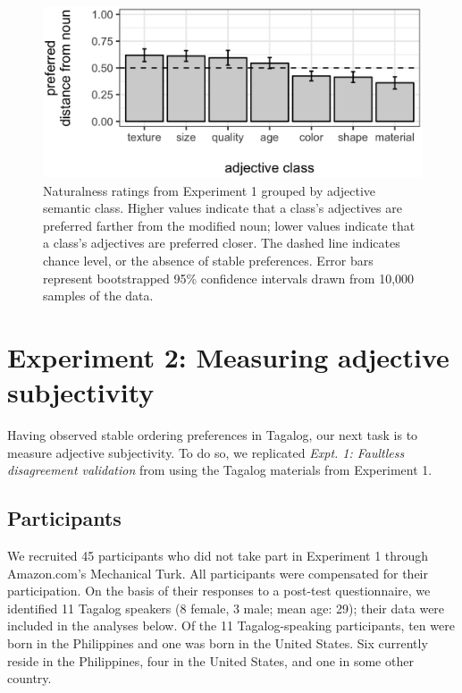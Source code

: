 \documentclass[12pt,letterpaper]{article}
\begin{document}
\begin{figure}
	\centering
	\includegraphics[height=2in]{LSA-class-distance.eps}
	\caption{Naturalness ratings from Experiment 1 grouped by adjective semantic class. Higher values indicate that a class's adjectives are preferred farther from the modified noun; lower values indicate that a class's adjectives are preferred closer. The dashed line indicates chance level, or the absence of stable preferences. Error bars represent bootstrapped 95\% confidence intervals drawn from 10,000 samples of the data.
	}
	\label{exp1-results}
\end{figure}




\section{Experiment 2: Measuring adjective subjectivity} \label{expt2}

Having observed stable ordering preferences in Tagalog, our next task is to measure adjective subjectivity. To do so, we replicated \emph{Expt. 1: Faultless disagreement validation} from \cite{scontrasetal2017adjectives} using the Tagalog materials from Experiment 1.

\subsection{Participants} 

We recruited 45 participants who did not take part in Experiment 1 through Amazon.com's Mechanical Turk. All participants were compensated for their participation. On the basis of their responses to a post-test questionnaire, we identified 11 Tagalog speakers (8 female, 3 male; mean age: 29); their data were included in the analyses below. Of the 11 Tagalog-speaking participants, ten were born in the Philippines and one was born in the United States. Six currently reside in the Philippines, four in the United States, and one in some other country.
\end{document}
